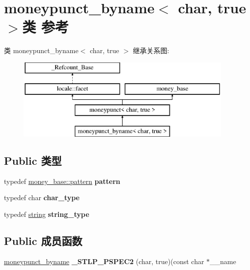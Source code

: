 \hypertarget{classmoneypunct__byname_3_01char_00_01true_01_4}{}\section{moneypunct\+\_\+byname$<$ char, true $>$类 参考}
\label{classmoneypunct__byname_3_01char_00_01true_01_4}
类 moneypunct\+\_\+byname$<$ char, true $>$ 继承关系图\+:\begin{figure}[H]
\begin{center}
\leavevmode
\includegraphics[height=4.000000cm]{classmoneypunct__byname_3_01char_00_01true_01_4}
\end{center}
\end{figure}
\subsection*{Public 类型}
\begin{DoxyCompactItemize}
\item 
\mbox{\label{classmoneypunct__byname_3_01char_00_01true_01_4_a1c7b3db439dd83e878886ed6ea932032}} 
typedef \hyperlink{structmoney__base_1_1pattern}{money\+\_\+base\+::pattern} {\bfseries pattern}
\item 
\mbox{\label{classmoneypunct__byname_3_01char_00_01true_01_4_a4f6d6b2af0ee94cea07e48c1663b5f9c}} 
typedef char {\bfseries char\+\_\+type}
\item 
\mbox{\label{classmoneypunct__byname_3_01char_00_01true_01_4_a0d25786ff01d110fa7df05424cb7ec49}} 
typedef \hyperlink{structstring}{string} {\bfseries string\+\_\+type}
\end{DoxyCompactItemize}
\subsection*{Public 成员函数}
\begin{DoxyCompactItemize}
\item 
\mbox{\label{classmoneypunct__byname_3_01char_00_01true_01_4_af57b2ad08ee8d4058d5f62959f7b2201}} 
\hyperlink{classmoneypunct__byname}{moneypunct\+\_\+byname} {\bfseries \+\_\+\+S\+T\+L\+P\+\_\+\+P\+S\+P\+E\+C2} (char, true)(const char $\ast$\+\_\+\+\_\+name
\end{DoxyCompactItemize}
